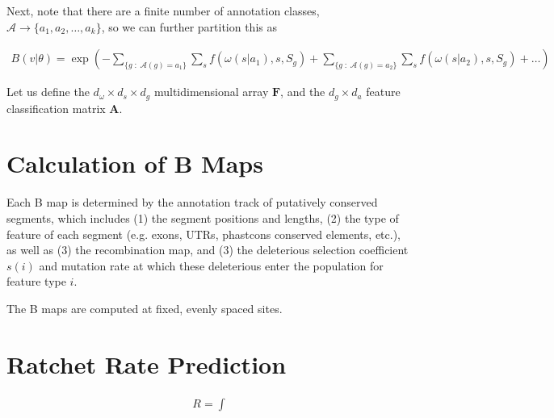 \documentclass[11pt]{article}
\begin{document}
Next, note that there are a finite number of annotation classes, $\mathcal{A}
\to \{a_1, a_2, \ldots, a_k\}$, so we can further partition this as

\begin{align}
  B(v | \theta) = \exp\left(- \sum_{\{g \;:\; \mathcal{A}(g) = a_1\}} \sum_s f(\omega(s| a_1), s, S_g) + \sum_{\{g \;:\; \mathcal{A}(g) = a_2\}} \sum_s f(\omega(s| a_2), s, S_g) + \ldots  \right)
\end{align}

Let us define the $d_\omega \times d_s \times d_g$ multidimensional array
$\mathbf{F}$, and the $d_g \times d_a$ feature classification matrix
$\mathbf{A}$.



  
\section{Calculation of B Maps}

Each B map is determined by the annotation track of putatively conserved
segments, which includes (1) the segment positions and lengths, (2) the type of
feature of each segment (e.g.  exons, UTRs, phastcons conserved elements,
etc.), as well as (3) the recombination map, and (3) the deleterious selection
coefficient $s(i)$ and mutation rate at which these deleterious enter the
population for feature type $i$.

The B maps are computed at fixed, evenly spaced sites.

\section{Ratchet Rate Prediction}

\begin{align}
  R = \int 
\end{align}

\printbibliography
\end{document}
